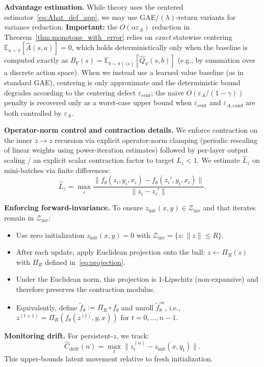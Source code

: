 \documentclass{article}
\theoremstyle{plain}
\theoremstyle{definition}
\theoremstyle{remark}
\newcommand{\E}{\mathbb{E}}
\begin{document}
\textbf{Advantage estimation.}
While theory uses the centered estimator~\eqref{eq:Ahat_def_app}, we may use GAE/$(\lambda)$-return variants for variance reduction.
\textbf{Important:} the $O(\alpha\varepsilon_A)$ reduction in Theorem~\ref{thm:monotone_with_error} relies on \emph{exact} statewise centering $\E_{a\sim\pi}[\widehat{A}(s,a)]=0$, which holds deterministically only when the baseline is computed exactly as $B_V(s)=\E_{b\sim\pi(\cdot|s)}[\widehat Q_V(s,b)]$ (e.g., by summation over a discrete action space).
When we instead use a learned value baseline (as in standard GAE), centering is only approximate and the deterministic bound degrades according to the centering defect $\varepsilon_{\mathrm{cent}}$; the naive $O(\varepsilon_A/(1-\gamma))$ penalty is recovered only as a worst-case upper bound when $\varepsilon_{\mathrm{cent}}$ and $\varepsilon_{A,\mathrm{cand}}$ are both controlled by $\varepsilon_A$.

\textbf{Operator-norm control and contraction details.}
We enforce contraction on the inner $z\!\to\!z$ recursion via explicit operator-norm clamping (periodic rescaling of linear weights using power-iteration estimates) followed by per-layer output scaling / an explicit scalar contraction factor to target $L_z<1$.
We estimate $\hat L_z$ on mini-batches via finite differences:
\[
\hat L_z = \max_i \frac{\|f_\theta(z_i,y_i,x_i) - f_\theta(z_i',y_i,x_i)\|}{\|z_i - z_i'\|}.
\]

\textbf{Enforcing forward-invariance.}
To ensure $z_{\mathrm{init}}(x,y) \in \mathcal{Z}_{\mathrm{inv}}$ and that iterates remain in $\mathcal{Z}_{\mathrm{inv}}$:
\begin{itemize}
\item Use zero initialization $z_{\mathrm{init}}(x,y) = 0$ with $\mathcal{Z}_{\mathrm{inv}} = \{z : \|z\| \le R\}$.
\item After each update, apply Euclidean projection onto the ball: $z \gets \Pi_R(z)$ with $\Pi_R$ defined in~\eqref{eq:projection}.
\item Under the Euclidean norm, this projection is $1$-Lipschitz (non-expansive) and therefore preserves the contraction modulus.
\item Equivalently, define $\tilde f_\theta := \Pi_R \circ f_\theta$ and unroll $\tilde f_\theta^{\circ n}$, i.e.,
$z^{(t+1)}=\Pi_R(f_\theta(z^{(t)},y,x))$ for $t=0,\dots,n-1$.
\end{itemize}

\textbf{Monitoring drift.}
For persistent-$z$, we track:
\[
\widehat{C}_{\mathrm{drift}}(n) = \max_t \|z_t^{(n)} - z_{\mathrm{init}}(x,y_t)\|.
\]
This upper-bounds latent movement relative to fresh initialization.
\end{document}
